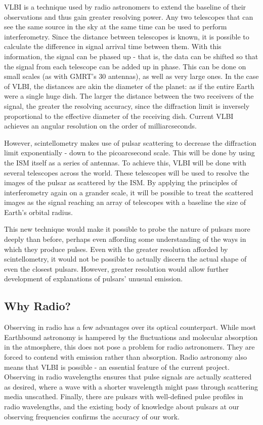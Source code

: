 \documentclass[a4paper,12pt]{article}
\begin{document}
VLBI is a technique used by radio astronomers to extend the baseline of their observations and thus gain greater resolving power. Any two telescopes that can see the same source in the sky at the same time can be used to perform interferometry. Since the distance between telescopes is known, it is possible to calculate the difference in signal arrival time between them. With this information, the signal can be phased up - that is, the data can be shifted so that the signal from each telescope can be added up in phase. This can be done on small scales (as with GMRT's 30 antennas), as well as very large ones. In the case of VLBI, the distances are akin the diameter of the planet: as if the entire Earth were a single huge dish. The larger the distance between the two receivers of the signal, the greater the resolving accuracy, since the diffraction limit is inversely proportional to the effective diameter of the receiving dish. Current VLBI achieves an angular resolution on the order of milliarcseconds\citep{anisotropicinsterstellar}. 

However, scintellometry makes use of pulsar scattering to decrease the diffraction limit exponentially - down to the picoarcsecond scale\citep{picoarcsecondastrometry}. This will be done by using the ISM itself as a series of antennas. To achieve this, VLBI will be done with several telescopes across the world. These telescopes will be used to resolve the images of the pulsar as scattered by the ISM\citep{anisotropicinsterstellar}. By applying the principles of interferometry again on a grander scale, it will be possible to treat the scattered images as the signal reaching an array of telescopes with a baseline the size of Earth's orbital radius.

This new technique would make it possible to probe the nature of pulsars more deeply than before, perhaps even affording some understanding of the ways in which they produce pulses. Even with the greater resolution afforded by scintellometry, it would not be possible to actually discern the actual shape of even the closest pulsars. However, greater resolution would allow further development of explanations of pulsars' unusual emission.

\subsection{Why Radio?}
\label{sec:radio}

Observing in radio has a few advantages over its optical counterpart. While most Earthbound astronomy is hampered by the fluctuations and molecular absorption in the atmosphere, this does not pose a problem for radio astronomers. They are forced to contend with emission rather than absorption. Radio astronomy also means that VLBI is possible - an essential feature of the current project. Observing in radio wavelengths ensures that pulse signals are actually scattered as desired, where a wave with a shorter wavelength might pass through scattering media unscathed. Finally, there are pulsars with well-defined pulse profiles in radio wavelengths, and the existing body of knowledge about pulsars at our observing frequencies confirms the accuracy of our work.
\end{document}
